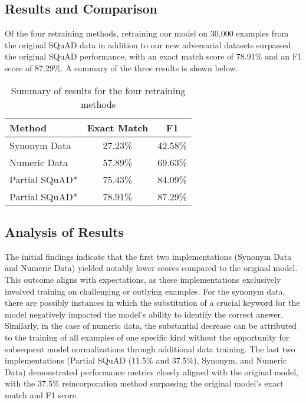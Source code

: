 \documentclass{article}
\begin{document}
\subsection{Results and Comparison}
Of the four retraining methods, retraining our model on 30,000 examples
from the original SQuAD data in addition to our new adversarial datasets
surpassed the original SQuAD performance, with an exact match score of 78.91\%
and an F1 score of 87.29\%. A summary of the three results is shown below.

\begin{table}[ht]
  \centering
  \begin{tabular}{lcc}
    \toprule
    \textbf{Method} & \textbf{Exact Match} & \textbf{F1} \\
    \midrule
    Synonym Data & 27.23\% & 42.58\% \\
    Numeric Data & 57.89\% & 69.63\% \\
    Partial SQuAD*\footnotemark[2] & 75.43\% & 84.09\% \\
    Partial SQuAD*\footnotemark[3] & 78.91\% & 87.29\% \\
    \bottomrule
  \end{tabular}
  \caption{Summary of results for the four retraining methods}
  \label{tab:retraining_results}
\end{table}

\subsection{Analysis of Results}
The initial findings indicate that the first two implementations
(Synonym Data and Numeric Data) yielded notably lower scores
compared to the original model. This outcome aligns with
expectations, as these implementations exclusively involved
training on challenging or outlying examples. For the synonym
data, there are possibly instances in which the substitution
of a crucial keyword for the model negatively impacted the
model’s ability to identify the correct answer. Similarly,
in the case of numeric data, the substantial decrease can be
attributed to the training of all examples of one specific
kind without the opportunity for subsequent model normalizations
through additional data training. The last two implementations
(Partial SQuAD (11.5\% and 37.5\%), Synonym, and Numeric Data)
demonstrated performance metrics closely aligned with the
original model, with the 37.5\% reincorporation method surpassing
the original model’s exact match and F1 score.
\end{document}
